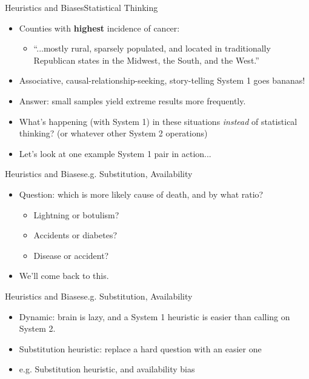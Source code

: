 \documentclass{beamer}
\begin{document}
\begin{frame}{Heuristics and Biases}{Statistical Thinking}
\begin{itemize}
\addtolength{\itemsep}{0.5\baselineskip}
\item Counties with {\bf highest} incidence of cancer:
  \begin{itemize}
  \item ``...mostly rural, sparsely populated, and located in traditionally Republican states in the Midwest, the South, and the West.''
  \end{itemize}
\item Associative, causal-relationship-seeking, story-telling System 1 goes bananas! 
\item Answer: small samples yield extreme results more frequently.
\item What's happening (with System 1) in these situations {\it instead} of statistical thinking? (or whatever other System 2 operations)
\item Let's look at one example System 1 pair in action...
\end{itemize}
\end{frame}

\begin{frame}{Heuristics and Biases}{e.g. Substitution, Availability}
\begin{itemize}
\item Question: which is more likely cause of death, and by what ratio? 
    \begin{itemize}
    \addtolength{\itemsep}{0.5\baselineskip}
    \item Lightning or botulism? 
    \item Accidents or diabetes? 
    \item Disease or accident? 
    \end{itemize}
\item We'll come back to this.
\end{itemize}
\end{frame}

\begin{frame}{Heuristics and Biases}{e.g. Substitution, Availability}
\begin{itemize}
\addtolength{\itemsep}{0.5\baselineskip}
\item Dynamic: brain is lazy, and a System 1 heuristic is easier than calling on System 2.
\item Substitution heuristic: replace a hard question with an easier one
\item e.g. Substitution heuristic, and availability bias
\end{itemize}
\end{frame}
\end{document}
